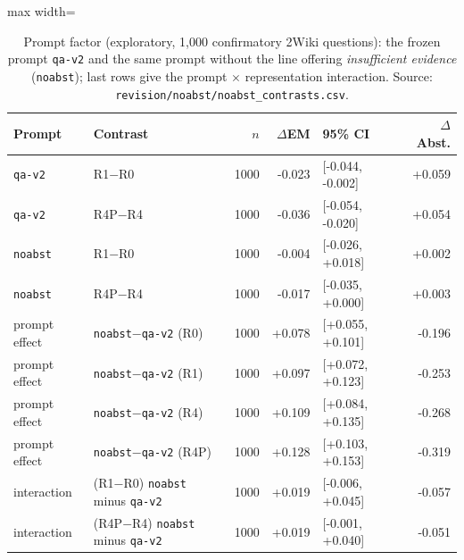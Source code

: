 \begin{table}[t]
\centering
\footnotesize
\begin{adjustbox}{max width=\linewidth}
\begin{tabular}{@{}llrrlr@{}}
\toprule
Prompt & Contrast & $n$ & $\Delta$EM & 95\% CI & $\Delta$Abst. \\
\midrule
\texttt{qa-v2} & R1$-$R0 & 1000 & -0.023 & [-0.044, -0.002] & +0.059 \\
\texttt{qa-v2} & R4P$-$R4 & 1000 & -0.036 & [-0.054, -0.020] & +0.054 \\
\texttt{noabst} & R1$-$R0 & 1000 & -0.004 & [-0.026, +0.018] & +0.002 \\
\texttt{noabst} & R4P$-$R4 & 1000 & -0.017 & [-0.035, +0.000] & +0.003 \\
prompt effect & \texttt{noabst}$-$\texttt{qa-v2} (R0) & 1000 & +0.078 & [+0.055, +0.101] & -0.196 \\
prompt effect & \texttt{noabst}$-$\texttt{qa-v2} (R1) & 1000 & +0.097 & [+0.072, +0.123] & -0.253 \\
prompt effect & \texttt{noabst}$-$\texttt{qa-v2} (R4) & 1000 & +0.109 & [+0.084, +0.135] & -0.268 \\
prompt effect & \texttt{noabst}$-$\texttt{qa-v2} (R4P) & 1000 & +0.128 & [+0.103, +0.153] & -0.319 \\
interaction & (R1$-$R0) \texttt{noabst} minus \texttt{qa-v2} & 1000 & +0.019 & [-0.006, +0.045] & -0.057 \\
interaction & (R4P$-$R4) \texttt{noabst} minus \texttt{qa-v2} & 1000 & +0.019 & [-0.001, +0.040] & -0.051 \\
\bottomrule
\end{tabular}
\end{adjustbox}
\caption{Prompt factor (exploratory, 1{,}000 confirmatory 2Wiki questions): the frozen prompt \texttt{qa-v2} and the same prompt without the line offering \emph{insufficient evidence} (\texttt{noabst}); last rows give the prompt $\times$ representation interaction. Source: \texttt{revision/\allowbreak noabst/\allowbreak noabst\_contrasts.csv}.}
\label{tab:noabst}
\end{table}

